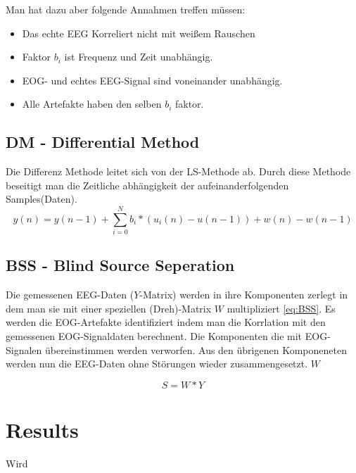 \documentclass[preprint,12pt]{elsarticle}
\begin{document}
Man hat dazu aber folgende Annahmen treffen müssen:
\begin{itemize}
 \item Das echte EEG Korreliert nicht mit weißem Rauschen
 \item Faktor $b_i$ ist Frequenz und Zeit unabhängig.
 \item EOG- und echtes EEG-Signal sind voneinander unabhängig.
 \item Alle Artefakte haben den selben $b_i$ faktor.
\end{itemize}




\subsection{DM - Differential Method}

Die Differenz Methode leitet sich von der LS-Methode ab. Durch diese Methode beseitigt man die Zeitliche abhängigkeit der aufeinanderfolgenden Samples(Daten).
~\cite{Thulasidas2004}
\begin{equation} \label{eq:DM}
 y(n) = y(n - 1) + \sum_{i=0}^{N}  b_i * (u_i(n) - u(n - 1)) + w(n) - w(n - 1)
\end{equation}



\subsection{BSS - Blind Source Seperation}
Die gemessenen EEG-Daten ($Y$-Matrix) werden in ihre Komponenten zerlegt in dem man sie mit einer speziellen (Dreh)-Matrix $W$ multipliziert \ref{eq:BSS}.
Es werden die EOG-Artefakte identifiziert indem man die Korrlation mit den gemessenen EOG-Signaldaten  berechnent. Die Komponenten die mit EOG-Signalen übereinstimmen werden
verworfen. Aus den übrigenen Komponeneten werden nun die EEG-Daten ohne Störungen wieder zusammengesetzt.
$W$
~\cite{Thulasidas2004}

\begin{equation} \label{eq:BSS}
 S = W*Y
\end{equation}

\section{Results}

Wird 



\end{document}
